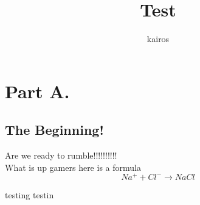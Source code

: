 \documentclass[12pt]{article}
\title{Test}
\author{kairos}
\begin{document}
    \section*{Part A.}
    \subsection*{The Beginning!}

    Are we ready to rumble!!!!!!!!!! \\

    What is up gamers here is a formula
    $$Na^+ + Cl^- \rightarrow NaCl$$


    testing testin
\end{document}
